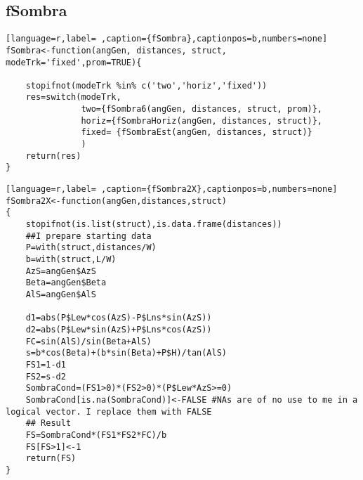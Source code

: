 \subsection{fSombra}
\label{sec:org224c995}
\label{subsec:fsombra}
\begin{lstlisting}[language=r,label= ,caption={fSombra},captionpos=b,numbers=none]
fSombra<-function(angGen, distances, struct, modeTrk='fixed',prom=TRUE){

    stopifnot(modeTrk %in% c('two','horiz','fixed'))
    res=switch(modeTrk, 
               two={fSombra6(angGen, distances, struct, prom)},
               horiz={fSombraHoriz(angGen, distances, struct)},
               fixed= {fSombraEst(angGen, distances, struct)}
               )
    return(res)
}
\end{lstlisting}
\begin{lstlisting}[language=r,label= ,caption={fSombra2X},captionpos=b,numbers=none]
fSombra2X<-function(angGen,distances,struct)
{
    stopifnot(is.list(struct),is.data.frame(distances))
    ##I prepare starting data	
    P=with(struct,distances/W)
    b=with(struct,L/W)
    AzS=angGen$AzS
    Beta=angGen$Beta
    AlS=angGen$AlS

    d1=abs(P$Lew*cos(AzS)-P$Lns*sin(AzS))
    d2=abs(P$Lew*sin(AzS)+P$Lns*cos(AzS))
    FC=sin(AlS)/sin(Beta+AlS)
    s=b*cos(Beta)+(b*sin(Beta)+P$H)/tan(AlS)
    FS1=1-d1
    FS2=s-d2
    SombraCond=(FS1>0)*(FS2>0)*(P$Lew*AzS>=0)
    SombraCond[is.na(SombraCond)]<-FALSE #NAs are of no use to me in a logical vector. I replace them with FALSE
    ## Result
    FS=SombraCond*(FS1*FS2*FC)/b
    FS[FS>1]<-1
    return(FS)
}	
\end{lstlisting}
